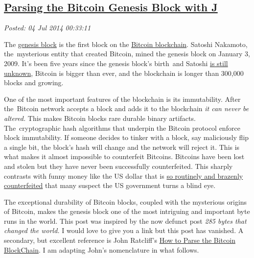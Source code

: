 %

\subsection*{\href{http://bakerjd99.wordpress.com/2014/07/03/parsing-the-bitcoin-genesis-block-with-j/}{Parsing the Bitcoin Genesis Block with J}}


\noindent\emph{Posted: 04 Jul 2014 00:33:11}
\vspace{6pt}

The \href{https://en.bitcoin.it/wiki/Genesis_block}{genesis block} is
the first block on the \href{https://blockexplorer.com/}{Bitcoin
blockchain}. Satoshi Nakamoto, the~mysterious entity that created
Bitcoin, mined the genesis block on January 3, 2009. It's been five
years since the genesis block's birth~and Satoshi
\href{http://en.wikipedia.org/wiki/Satoshi_Nakamoto}{is still unknown},
Bitcoin is bigger than ever, and the blockchain is longer than 300,000
blocks and growing.

One of the most important features of the blockchain is its
immutability. After the~Bitcoin network accepts a block and adds it to
the blockchain \emph{it can never be altered.} This makes Bitcoin blocks
rare durable binary artifacts. The~cryptographic hash algorithms that
underpin the Bitcoin protocol enforce block immutability. If someone
decides to tinker with a block, say maliciously flip a single bit, the
block's hash will change and the network will reject it. This is what
makes it almost impossible to counterfeit Bitcoins. Bitcoins have been
lost and stolen but they have never been successfully counterfeited.
This sharply contrasts with funny money like the US dollar that is
\href{http://www.npr.org/blogs/money/2013/09/05/219264902/the-world-capital-of-counterfeit-dollars}{so
routinely and brazenly counterfeited} that many suspect the US
government turns a blind eye.

The exceptional durability of Bitcoin blocks, coupled with the
mysterious origins of Bitcoin, makes the genesis block one of the most
intriguing and important byte runs in the world. This post was inspired
by the now defunct post \emph{285 bytes that changed the world.} I would
love to give you a link but this post has vanished. A secondary, but
excellent reference is John Ratcliff's
\href{http://codesuppository.blogspot.com/2014/01/how-to-parse-bitcoin-blockchain.html}{How
to Parse the Bitcoin BlockChain}. I am adapting John's nomenclature in
what follows.

